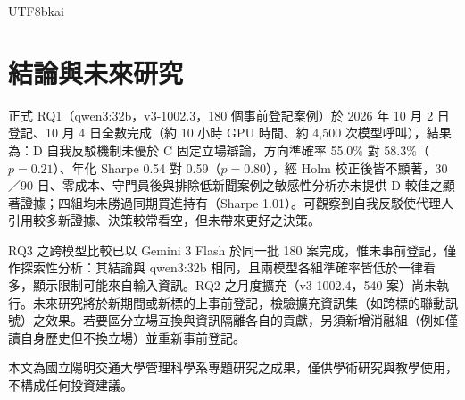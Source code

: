 \documentclass[12pt,a4paper]{article}
\newcommand{\grp}[1]{\textsf{#1}}
\begin{document}
\begin{CJK}{UTF8}{bkai}
\section{結論與未來研究}
\label{sec:conclusion}

正式 RQ1（qwen3:32b，v3-1002.3，180 個事前登記案例）於 2026 年 10 月 2 日登記、10 月 4 日全數完成（約 10 小時 GPU 時間、約 4,500 次模型呼叫），結果為：\grp{D} 自我反駁機制未優於 \grp{C} 固定立場辯論，方向準確率 55.0\% 對 58.3\%（$p=0.21$）、年化 Sharpe 0.54 對 0.59（$p=0.80$），經 Holm 校正後皆不顯著，30／90 日、零成本、守門員後與排除低新聞案例之敏感性分析亦未提供 D 較佳之顯著證據；四組均未勝過同期買進持有（Sharpe 1.01）。可觀察到自我反駁使代理人引用較多新證據、決策較常看空，但未帶來更好之決策。


RQ3 之跨模型比較已以 Gemini 3 Flash 於同一批 180 案完成，惟未事前登記，僅作探索性分析：其結論與 qwen3:32b 相同，且兩模型各組準確率皆低於一律看多，顯示限制可能來自輸入資訊。RQ2 之月度擴充（v3-1002.4，540 案）尚未執行。未來研究將於新期間或新標的上事前登記，檢驗擴充資訊集（如跨標的聯動訊號）之效果。若要區分立場互換與資訊隔離各自的貢獻，另須新增消融組（例如僅讀自身歷史但不換立場）並重新事前登記。

\vspace{0.8cm}
\noindent\small 本文為國立陽明交通大學管理科學系專題研究之成果，僅供學術研究與教學使用，不構成任何投資建議。
\normalsize

\clearpage



\clearpage
\end{CJK}
\end{document}
